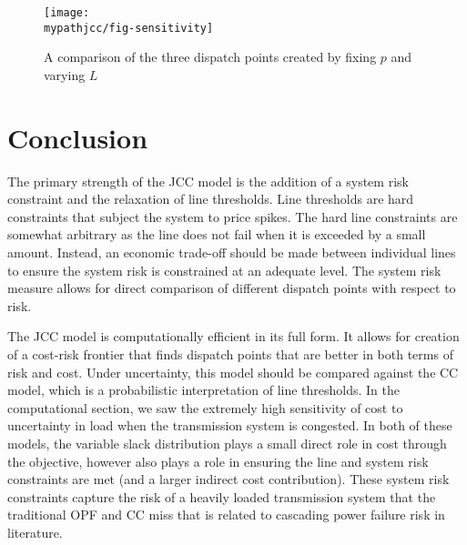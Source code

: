 \begin{figure}
\centering
\texttt{[image: \\mypathjcc/fig-sensitivity]}
\caption[A comparison of the three dispatch points for varying risk function parameters]{A comparison of the three dispatch points created by fixing $p$ and varying $L$}\label{figsense}
\end{figure}






\section{Conclusion}


The primary strength of the JCC model is the addition of a system risk constraint and the relaxation of line thresholds. Line thresholds are hard constraints that subject the system to price spikes.  The hard line constraints are somewhat arbitrary as the line does not fail when it is exceeded by a small amount.  Instead, an economic trade-off should be made between individual lines to ensure the system risk is constrained at an adequate level.  The system risk measure allows for direct comparison of different dispatch points with respect to risk.

The JCC model is computationally efficient in its full form.  It allows for creation of a cost-risk frontier that finds dispatch points that are better in both terms of risk and cost.  Under uncertainty, this model should be compared against the CC model, which is a probabilistic interpretation of line thresholds.   In the computational section, we saw the extremely high sensitivity of cost to uncertainty in load when the transmission system is congested.  In both of these models, the variable slack distribution plays a small direct role in cost through the objective, however also plays a role in ensuring the line and system risk constraints are met (and a larger indirect cost contribution).  These system risk constraints capture the risk of a heavily loaded transmission system that the traditional OPF and CC miss that is related to cascading power failure risk in literature.
  



